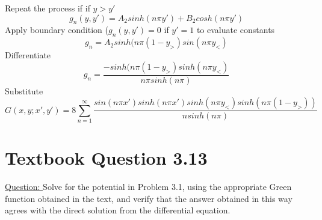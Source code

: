 \documentclass[12pt]{article}
\begin{document}
    Repeat the process if if $y>y'$
    \begin{equation} \label{eq: 2.2.11}
        g_n(y,y') = A_2 sinh(n \pi y') + B_2 cosh(n \pi y')  
    \end{equation}
    Apply boundary condition ($g_n(y,y') = 0$ if  $y'=1$ to evaluate constants
    \begin{equation} \label{eq: 2.2.12}
        g_n = A_2 sinh(n \pi (1-y_>) sin(n \pi y_<)
    \end{equation}
    Differentiate
    \begin{equation} \label{eq: 2.2.13}
        g_n = \frac{-sinh(n \pi (1-y_>) sinh(n \pi y_<)}{n \pi sinh(n \pi)}
    \end{equation}
    Substitute
    \begin{equation} \label{eq: 2.2.14}
        G(x,y;x', y') = 8 \sum_{n=1}^\infty \frac{sin(n \pi x') sinh(n \pi x') sinh (n \pi y_<) sinh(n \pi (1-y_>))}{n sinh(n \pi)} 
    \end{equation}



    
\newpage
\section{Textbook Question 3.13} \label{section3}
    \underline{Question: }
    \newline Solve for the potential in Problem 3.1, using the appropriate Green function obtained in the text, and verify that the answer obtained in this way agrees with the direct solution from the differential equation.
\end{document}
